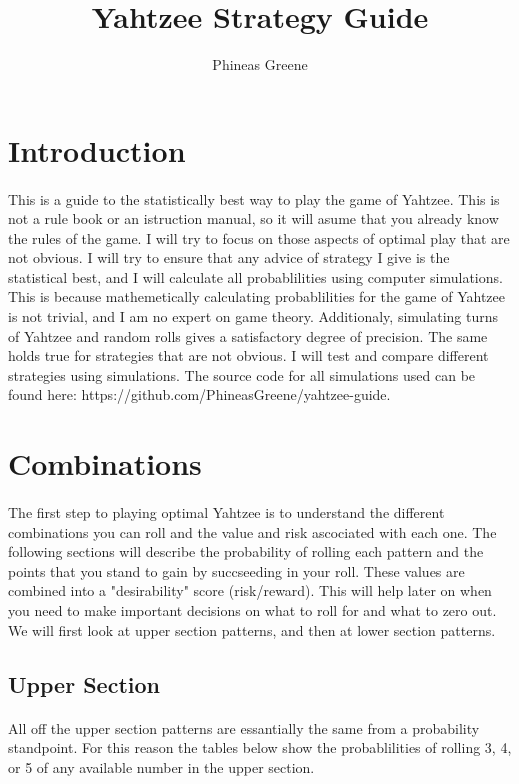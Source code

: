 \documentclass{article}
\title{Yahtzee Strategy Guide}
\author{Phineas Greene}
\begin{document}
\maketitle

\section{Introduction}
\paragraph{}
This is a guide to the statistically best way to play the game of Yahtzee. This is not a rule book or an istruction manual, so it will asume that you already know the rules of the game. I will try to focus on those aspects of optimal play that are not obvious.  I will try to ensure that any advice of strategy I give is the statistical best, and I will calculate all probablilities using computer simulations. This is because mathemetically calculating probablilities for the game of Yahtzee is not trivial, and I am no expert on game theory. Additionaly, simulating turns of Yahtzee and random rolls gives a satisfactory degree of precision. The same holds true for strategies that are not obvious. I will test and compare different strategies using simulations. The source code for all simulations used can be found here: https://github.com/PhineasGreene/yahtzee-guide.

\section{Combinations}
\paragraph{}
The first step to playing optimal Yahtzee is to understand the different combinations you can roll and the value and risk ascociated with each one. The following sections will describe the probability of rolling each pattern and the points that you stand to gain by succseeding in your roll. These values are combined into a "desirability" score (risk/reward). This will help later on when you need to make important decisions on what to roll for and what to zero out. We will first look at upper section patterns, and then at lower section patterns.
\subsection{Upper Section}
\paragraph{}
All off the upper section patterns are essantially the same from a probability standpoint. For this reason the tables below show the probablilities of rolling 3, 4, or 5 of any available number in the upper section. 
\end{document}
